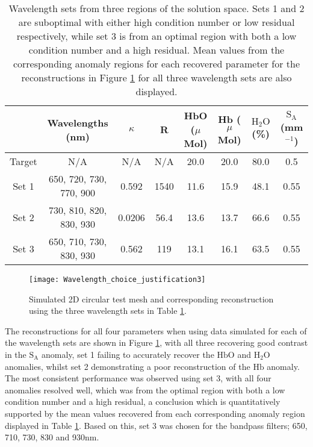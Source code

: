 \documentclass[twoside]{bhamthesis}
\theoremstyle{definition}
\begin{document}
\bgroup
\def\arraystretch{1.2}
\begin{table}[!ht]
\footnotesize
\begin{center}
 \begin{tabular}{c c c c c c c c} 
 \hline
& Wavelengths (nm) & $\kappa$ & R & HbO ($\mu$Mol) & Hb ($\mu$Mol) & $\mathrm{H_2O}$ (\%) & $\mathrm{S_A}$ (mm$^{-1}$) \\ [0.6ex] 
 \hline
Target & N/A & N/A & N/A & 20.0 & 20.0 & 80.0 & 0.5 \\
Set 1 & 650, 720, 730, 770, 900 & 0.592 & 1540 & 11.6 & 15.9 & 48.1 & 0.55 \\ 
Set 2 & 730, 810, 820, 830, 930  & 0.0206 &  56.4 &  13.6 & 13.7 & 66.6 & 0.55  \\
Set 3 & 650, 710, 730, 830, 930 & 0.562 &  119 & 13.1 & 16.1 & 63.5 & 0.55 \\
\hline				
\end{tabular}
\caption{Wavelength sets from three regions of the solution space. Sets 1 and 2 are suboptimal with either high condition number or low residual respectively, while set 3 is from an optimal region with both a low condition number and a high residual. Mean values from the corresponding anomaly regions for each recovered parameter for the reconstructions in Figure 
\ref{justification_wavelength} for all three wavelength sets are also displayed.}
\label{tab:Wavelngth_sets}
\end{center}
\end{table}
\egroup
    
\begin{figure}[!ht]
\centering
  \texttt{[image: Wavelength\_choice\_justification3]}
\caption{Simulated 2D circular test mesh and corresponding reconstruction using the three wavelength sets in Table \ref{tab:Wavelngth_sets}.}
\label{justification_wavelength}
\end{figure}
 
The reconstructions for all four parameters when using data simulated for each of the wavelength sets are shown in Figure 
\ref{justification_wavelength}, with all three recovering good contrast in the $\mathrm{S_A}$ anomaly, set 1 failing to accurately recover the $\mathrm{HbO}$ and $\mathrm{H_2O}$ anomalies, whilst set 2 demonstrating a poor reconstruction of the $\mathrm{Hb}$ anomaly. The most consistent performance was observed using set 3, with all four anomalies resolved well, which was from the optimal region with both a low condition number and a high residual, a conclusion which is quantitatively supported by the mean values recovered from each corresponding anomaly region displayed in Table \ref{tab:Wavelngth_sets}. Based on this, set 3 was chosen for the
bandpass filters; 650, 710, 730, 830 and 930nm.
\end{document}
